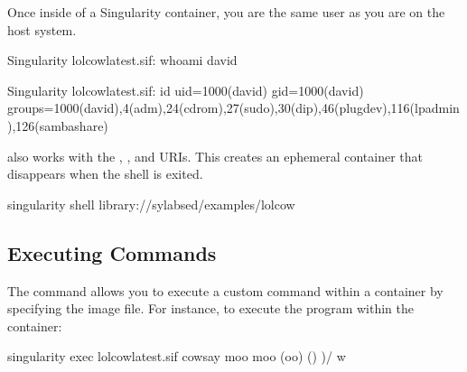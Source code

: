 \documentclass[letterpaper,10pt,english]{sphinxmanual}
\begin{document}
Once inside of a Singularity container, you are the same user as you are on the
host system.

%
\begin{sphinxVerbatim}[commandchars=\\\{\}]
Singularity lolcow\PYGZus{}latest.sif:\PYGZti{}\PYGZgt{} whoami
david

Singularity lolcow\PYGZus{}latest.sif:\PYGZti{}\PYGZgt{} id
uid=1000(david) gid=1000(david) groups=1000(david),4(adm),24(cdrom),27(sudo),30(dip),46(plugdev),116(lpadmin),126(sambashare)
\end{sphinxVerbatim}

 also works with the , , and 
URIs. This creates an ephemeral container that disappears when the shell is
exited.

%
\begin{sphinxVerbatim}[commandchars=\\\{\}]
\PYGZdl{} singularity shell library://sylabsed/examples/lolcow
\end{sphinxVerbatim}


\subsection{Executing Commands}
\label{\detokenize{quick_start:executing-commands}}
The  command allows you to execute a custom command
within a container by specifying the image file. For instance, to execute the
 program within the  container:

%
\begin{sphinxVerbatim}[commandchars=\\\{\}]
\PYGZdl{} singularity exec lolcow\PYGZus{}latest.sif cowsay moo
 \PYGZus{}\PYGZus{}\PYGZus{}\PYGZus{}\PYGZus{}
\PYGZlt{} moo \PYGZgt{}
 \PYGZhy{}\PYGZhy{}\PYGZhy{}\PYGZhy{}\PYGZhy{}
        \PYGZbs{}   \PYGZca{}\PYGZus{}\PYGZus{}\PYGZca{}
         \PYGZbs{}  (oo)\PYGZbs{}\PYGZus{}\PYGZus{}\PYGZus{}\PYGZus{}\PYGZus{}\PYGZus{}\PYGZus{}
            (\PYGZus{}\PYGZus{})\PYGZbs{}       )\PYGZbs{}/\PYGZbs{}
                \textbar{}\textbar{}\PYGZhy{}\PYGZhy{}\PYGZhy{}\PYGZhy{}w \textbar{}
                \textbar{}\textbar{}     \textbar{}\textbar{}
\end{sphinxVerbatim}
\end{document}
